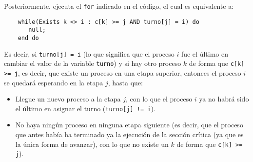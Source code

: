 Posteriormente, ejecuta el \verb|for| indicado en el código, el cual es equivalente a:
\begin{verbatim}
    while(Exists k <> i : c[k] >= j AND turno[j] = i) do 
       null;
    end do
\end{verbatim}
Es decir, si \verb|turno[j] = i| (lo que significa que el proceso $i$ fue el último en cambiar el valor de la variable \verb|turno|) y si hay otro proceso $k$ de forma que \verb|c[k] >= j|, es decir, que existe un proceso en una etapa superior, entonces el proceso $i$ se quedará esperando en la etapa $j$, hasta que:
\begin{itemize}
    \item Llegue un nuevo proceso a la etapa $j$, con lo que el proceso $i$ ya no habrá sido el último en asignar el turno (\verb|turno[j] != i|).
    \item No haya ningún proceso en ninguna etapa siguiente (es decir, que el proceso que antes había ha terminado ya la ejecución de la sección crítica (ya que es la única forma de avanzar), con lo que no existe un $k$ de forma que \verb|c[k] >= j|).
\end{itemize}

